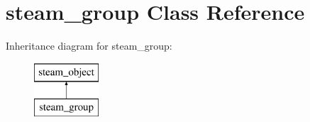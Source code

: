 \hypertarget{classsteam__group}{
\section{steam\_\-group Class Reference}
\label{classsteam__group}
}
Inheritance diagram for steam\_\-group:\begin{figure}[H]
\begin{center}
\leavevmode
\includegraphics[height=2.000000cm]{classsteam__group}
\end{center}
\end{figure}
